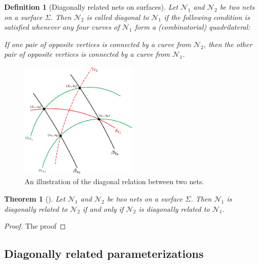 \documentclass[12pt,a4paper]{article}
\theoremstyle{BoldTopSpacing}
\newtheorem{theorem}{Theorem}[section]
\theoremstyle{BoldTopSpacing}
\theoremstyle{BoldTopSpacing}
\theoremstyle{BoldTopBottomSpacing}
\newtheorem{definition}{Definition}[section]
\theoremstyle{BoldTopSpacing}
\theoremstyle{BoldTopBottomSpacing}
\theoremstyle{remark}
\begin{document}
\begin{definition}[Diagonally related nets on surfaces]
\label{def:diag-nets-on-surfaces}
Let $\mathcal{N}_{1}$ and $\mathcal{N}_{2}$ be two nets on a surface $\Sigma$. Then $\mathcal{N}_{2}$ is called diagonal
to $\mathcal{N}_{1}$ if the following condition is satisfied whenever any four curves of $\mathcal{N}_{1}$ form a
(combinatorial) quadrilateral:\\
\begin{mybox}{}
If one pair of opposite vertices is connected by a curve from $\mathcal{N}_{2}$, then the other pair of opposite vertices is connected by a curve from $\mathcal{N}_{1}$.
\end{mybox}
\end{definition}

\begin{figure}[H]
    \centering
    \includegraphics[width=0.5\textwidth]{diagonally_related_diagram.png}
    \caption{An illustration of the diagonal relation between two nets.}
    \label{fig:diagonally-related-diagram}
\end{figure}

\begin{theorem}[]
\label{thm:symmetric-definition-diagonal-nets}
Let $\mathcal{N}_1$ and $\mathcal{N}_2$ be two nets on a surface $\Sigma$. Then $\mathcal{N}_1$ is diagonally related to
$\mathcal{N}_2$ if and only if $\mathcal{N}_2$ is diagonally related to $\mathcal{N}_1$.
\end{theorem}

\begin{proof}
    The proof
\end{proof}

\subsection{Diagonally related parameterizations}
\pagebreak
\end{document}
